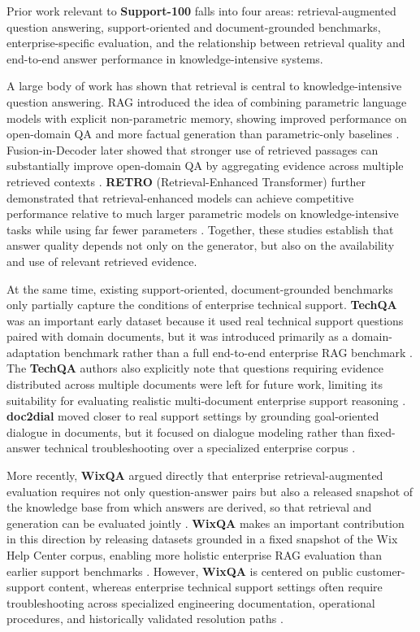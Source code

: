 \documentclass[11pt]{article}
\begin{document}
Prior work relevant to \textbf{Support-100} falls into four areas:
retrieval-augmented question answering, support-oriented and
document-grounded benchmarks, enterprise-specific evaluation, and the
relationship between retrieval quality and end-to-end answer performance
in knowledge-intensive systems.

A large body of work has shown that retrieval is central to
knowledge-intensive question answering. RAG introduced the idea of
combining parametric language models with explicit non-parametric
memory, showing improved performance on open-domain QA and more factual
generation than parametric-only baselines \citep{lewis2020}.
Fusion-in-Decoder later showed that stronger use of retrieved passages
can substantially improve open-domain QA by aggregating evidence across
multiple retrieved contexts \citep{izacard2021}. \textbf{RETRO} 
(Retrieval-Enhanced Transformer) further demonstrated that 
retrieval-enhanced models can achieve competitive performance relative 
to much larger parametric models on knowledge-intensive tasks 
while using far fewer parameters \citep{borgeaud2022}. Together, 
these studies establish that answer quality depends not only on 
the generator, but also on the availability and use of relevant 
retrieved evidence.

At the same time, existing support-oriented, document-grounded
benchmarks only partially capture the conditions of enterprise technical
support. \textbf{TechQA} was an important early dataset because it used real
technical support questions paired with domain documents, but it was
introduced primarily as a domain-adaptation benchmark rather than a full
end-to-end enterprise RAG benchmark \citep{castelli2020}. The \textbf{TechQA}
authors also explicitly note that questions requiring evidence
distributed across multiple documents were left for future work,
limiting its suitability for evaluating realistic multi-document
enterprise support reasoning \citep{castelli2020}. \textbf{doc2dial} moved
closer to real support settings by grounding goal-oriented dialogue in
documents, but it focused on dialogue modeling rather than fixed-answer
technical troubleshooting over a specialized enterprise corpus 
\citep{feng2020}.

More recently, \textbf{WixQA} argued directly that enterprise
retrieval-augmented evaluation requires not only question-answer pairs but also a 
released snapshot of the knowledge base from which answers are derived, so 
that retrieval and generation can be evaluated jointly \citep{cohen2025}.
\textbf{WixQA} makes an important contribution in this direction by releasing
datasets grounded in a fixed snapshot of the Wix Help Center corpus,
enabling more holistic enterprise RAG evaluation than earlier support
benchmarks \citep{cohen2025}. However, \textbf{WixQA} is centered on public
customer-support content, whereas enterprise technical support settings
often require troubleshooting across specialized engineering
documentation, operational procedures, and historically validated
resolution paths \citep{cohen2025}.
\end{document}
